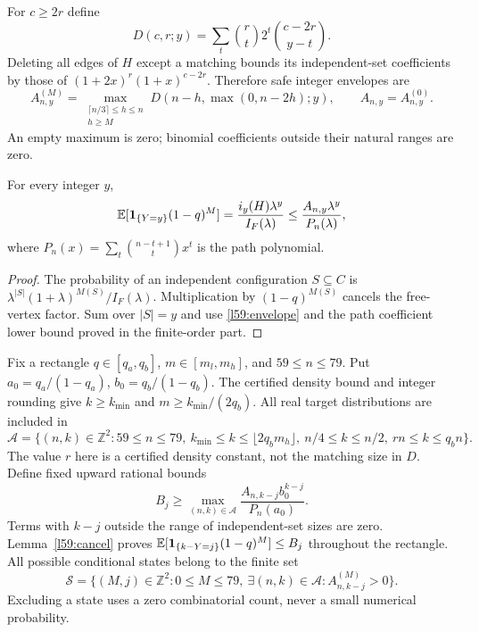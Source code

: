 For $c\ge2r$ define
\[
 D(c,r;y)=\sum_t\binom rt2^t\binom{c-2r}{y-t}.
\]
Deleting all edges of $H$ except a matching bounds its independent-set coefficients by those of $(1+2x)^r(1+x)^{c-2r}$. Therefore safe integer envelopes are
\begin{equation}\label{l59:envelope}
 A_{n,y}^{(M)}=\max_{\substack{\lceil n/3\rceil\le h\le n\\h\ge M}}
 D(n-h,\max(0,n-2h);y),\qquad A_{n,y}=A_{n,y}^{(0)}.
\end{equation}
An empty maximum is zero; binomial coefficients outside their natural ranges are zero.

\begin{lemma}\label{l59:cancel}
For every integer $y$,
\[
 \mathbb E[\mathbf1_{\{Y=y\}}(1-q)^M]
 =\frac{i_y(H)\lambda^y}{I_F(\lambda)}
 \le\frac{A_{n,y}\lambda^y}{P_n(\lambda)},
\]
where $P_n(x)=\sum_t\binom{n-t+1}{t}x^t$ is the path polynomial.
\end{lemma}
\begin{proof}
The probability of an independent configuration $S\subseteq C$ is $\lambda^{|S|}(1+\lambda)^{M(S)}/I_F(\lambda)$. Multiplication by $(1-q)^{M(S)}$ cancels the free-vertex factor. Sum over $|S|=y$ and use \eqref{l59:envelope} and the path coefficient lower bound proved in the finite-order part.
\end{proof}

Fix a rectangle $q\in[q_a,q_b]$, $m\in[m_l,m_h]$, and $59\le n\le79$. Put $a_0=q_a/(1-q_a)$, $b_0=q_b/(1-q_b)$. The certified density bound and integer rounding give $k\ge k_{\min}$ and $m\ge k_{\min}/(2q_b)$. All real target distributions are included in
\[
 \mathcal A=\{(n,k)\in\mathbb Z^2:59\le n\le79,\ k_{\min}\le k\le\lfloor2q_bm_h\rfloor,
 \ n/4\le k\le n/2,\ rn\le k\le q_bn\}.
\]
The value $r$ here is a certified density constant, not the matching size in $D$. Define fixed upward rational bounds
\[
 B_j\ge\max_{(n,k)\in\mathcal A}\frac{A_{n,k-j}b_0^{k-j}}{P_n(a_0)}.
\]
Terms with $k-j$ outside the range of independent-set sizes are zero. Lemma~\ref{l59:cancel} proves $\mathbb E[\mathbf1_{\{k-Y=j\}}(1-q)^M]\le B_j$ throughout the rectangle. All possible conditional states belong to the finite set
\[
 \mathcal S=\{(M,j)\in\mathbb Z^2:0\le M\le79,\ \exists(n,k)\in\mathcal A:
 A_{n,k-j}^{(M)}>0\}.
\]
Excluding a state uses a zero combinatorial count, never a small numerical probability.

